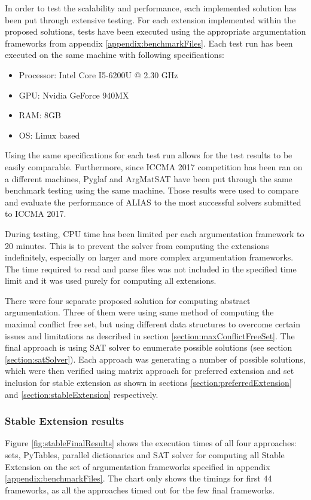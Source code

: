 In order to test the scalability and performance, each implemented solution has been put through extensive testing. For each extension implemented within the proposed solutions, tests have been executed using the appropriate argumentation frameworks from appendix \ref{appendix:benchmarkFiles}. Each test run has been executed on the same machine with following specifications:

\begin{itemize}
	\item Processor: Intel Core I5-6200U @ 2.30 GHz
	\item GPU: Nvidia GeForce 940MX
	\item RAM: 8GB
	\item OS: Linux based
\end{itemize}

Using the same specifications for each test run allows for the test results to be easily comparable. Furthermore, since ICCMA 2017 competition has been ran on a different machines, Pyglaf \citep{pyglaf} and ArgMatSAT \citep{argmatSat} have been put through the same benchmark testing using the same machine. Those results were used to compare and evaluate the performance of ALIAS to the most successful solvers submitted to ICCMA 2017.

During testing, CPU time has been limited per each argumentation framework to 20 minutes. This is to prevent the solver from computing the extensions indefinitely, especially on larger and more complex argumentation frameworks. The time required to read and parse files was not included in the specified time limit and it was used purely for computing all extensions. 

There were four separate proposed solution for computing abstract argumentation. Three of them were using same method of computing the maximal conflict free set, but using different data structures to overcome certain issues and limitations as described in section \ref{section:maxConflictFreeSet}. The final approach is using SAT solver to enumerate possible solutions (see section \ref{section:satSolver}). Each approach was generating a number of possible solutions, which were then verified using matrix approach for preferred extension and set inclusion for stable extension as shown in sections \ref{section:preferredExtension} and \ref{section:stableExtension} respectively. 

\subsubsection{Stable Extension results} \label{section:stableExtensionResults}
Figure \ref{fig:stableFinalResults} shows the execution times of all four approaches: sets, PyTables, parallel dictionaries and SAT solver for computing all Stable Extension on the set of argumentation frameworks specified in appendix \ref{appendix:benchmarkFiles}. The chart only shows the timings for first 44 frameworks, as all the approaches timed out for the few final frameworks.

